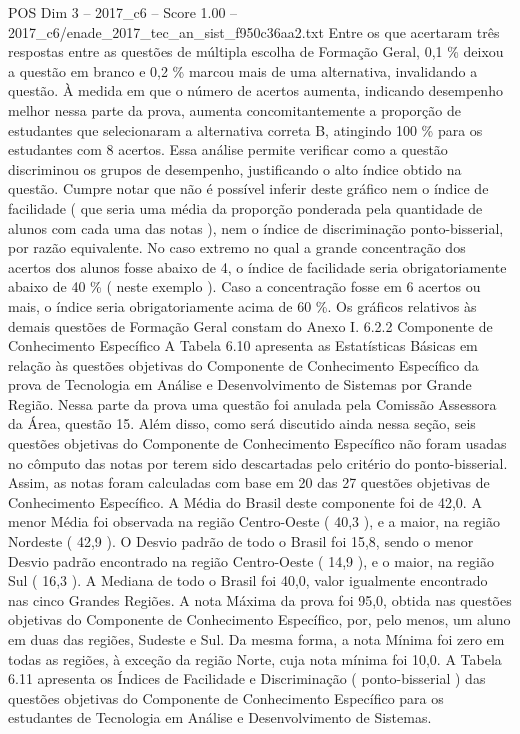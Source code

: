 \begin{textsample}{POS Dim 3 – 2017\_c6 – Score 1.00 – 2017\_c6/enade\_2017\_tec\_an\_sist\_f950c36aa2.txt}
Entre os que acertaram três respostas entre as questões de múltipla escolha de Formação Geral, 0,1 \% deixou a questão em branco e 0,2 \% marcou mais de uma alternativa, invalidando a questão.
À medida em que o número de acertos aumenta, indicando desempenho melhor nessa parte da prova, aumenta concomitantemente a proporção de estudantes que selecionaram a alternativa correta B, atingindo 100 \% para os estudantes com 8 acertos.
Essa análise permite verificar como a questão discriminou os grupos de desempenho, justificando o alto índice obtido na questão.
Cumpre notar que não é possível inferir deste gráfico nem o índice de facilidade ( que seria uma média da proporção ponderada pela quantidade de alunos com cada uma das notas ), nem o índice de discriminação ponto-bisserial, por razão equivalente.
No caso extremo no qual a grande concentração dos acertos dos alunos fosse abaixo de 4, o índice de facilidade seria obrigatoriamente abaixo de 40 \% ( neste exemplo ).
Caso a concentração fosse em 6 acertos ou mais, o índice seria obrigatoriamente acima de 60 \%.
Os gráficos relativos às demais questões de Formação Geral constam do Anexo I. 6.2.2 Componente de Conhecimento Específico A Tabela 6.10 apresenta as Estatísticas Básicas em relação às questões objetivas do Componente de Conhecimento Específico da prova de Tecnologia em Análise e Desenvolvimento de Sistemas por Grande Região.
Nessa parte da prova uma questão foi anulada pela Comissão Assessora da Área, questão 15.
Além disso, como será discutido ainda nessa seção, seis questões objetivas do Componente de Conhecimento Específico não foram usadas no cômputo das notas por terem sido descartadas pelo critério do ponto-bisserial.
Assim, as notas foram calculadas com base em 20 das 27 questões objetivas de Conhecimento Específico.
A Média do Brasil deste componente foi de 42,0.
A menor Média foi observada na região Centro-Oeste ( 40,3 ), e a maior, na região Nordeste ( 42,9 ).
O Desvio padrão de todo o Brasil foi 15,8, sendo o menor Desvio padrão encontrado na região Centro-Oeste ( 14,9 ), e o maior, na região Sul ( 16,3 ).
A Mediana de todo o Brasil foi 40,0, valor igualmente encontrado nas cinco Grandes Regiões.
A nota Máxima da prova foi 95,0, obtida nas questões objetivas do Componente de Conhecimento Específico, por, pelo menos, um aluno em duas das regiões, Sudeste e Sul.
Da mesma forma, a nota Mínima foi zero em todas as regiões, à exceção da região Norte, cuja nota mínima foi 10,0.
A Tabela 6.11 apresenta os Índices de Facilidade e Discriminação ( ponto-bisserial ) das questões objetivas do Componente de Conhecimento Específico para os estudantes de Tecnologia em Análise e Desenvolvimento de Sistemas.

\end{textsample}
